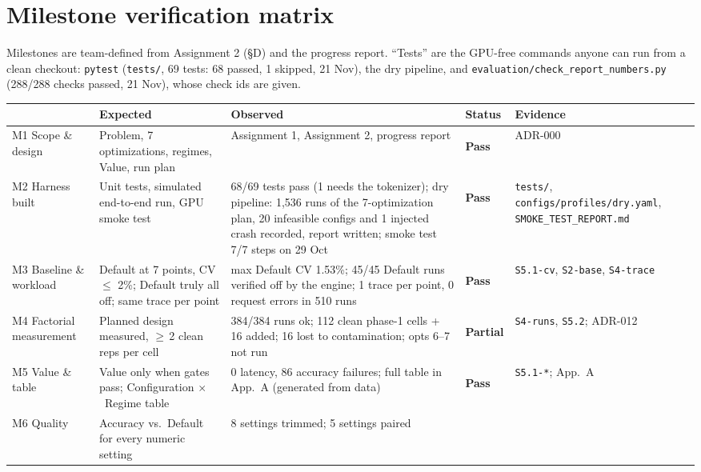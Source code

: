 \documentclass[10pt,a4paper]{article}
\newcommand{\hc}[1]{{\leavevmode\bfseries\color{ink}#1}}   %
\newcommand{\x}{\ensuremath{\times}}
\newcommand{\fp}[1]{{\leavevmode\urlstyle{tt}\color{codecol}\nolinkurl{#1}}}
\newcommand{\pill}[2]{\colorbox{#1}{\sffamily\footnotesize\strut #2}}
\newcommand{\pass}{\pill{passbg}{\textcolor{passgreen}{\textbf{Pass}}}}
\newcommand{\partl}{\pill{partbg}{\textbf{Partial}}}
\begin{document}
\section{Milestone verification matrix}\label{sec:milestones}
Milestones are team-defined from Assignment 2 (\S D) and the progress report. ``Tests'' are the GPU-free commands
anyone can run from a clean checkout: \texttt{pytest} (\fp{tests/}, 69 tests: 68 passed, 1 skipped, 21 Nov), the
dry pipeline, and \fp{evaluation/check_report_numbers.py} (288/288 checks passed, 21 Nov), whose check ids are given.

{\small
\setlength{\tabcolsep}{3.5pt}
\begin{longtable}{@{}P{2.4cm}P{4.3cm}P{5.1cm}P{1.3cm}P{2.4cm}@{}}
\toprule
\rowcolor{tblhead}\hc{Milestone} & \hc{Expected} & \hc{Observed} & \hc{Status} & \hc{Evidence} \\
\midrule\endhead
M1 Scope \& design & Problem, 7 optimizations, regimes, Value, run plan & Assignment 1, Assignment 2, progress report
& \pass & ADR-000 \\
 M2 Harness built & Unit tests, simulated end-to-end run, GPU smoke test & 68/69 tests pass (1 needs
the tokenizer); dry pipeline: 1,536 runs of the 7-optimization plan, 20 infeasible configs and 1 injected crash
recorded, report written; smoke test 7/7 steps on 29 Oct & \pass & \fp{tests/},
\fp{configs/profiles/dry.yaml}, \fp{SMOKE_TEST_REPORT.md} \\
M3 Baseline \& workload & Default at 7 points, CV $\le$ 2\%; Default truly all off; same trace per point & max
Default CV 1.53\%; 45/45 Default runs verified off by the engine; 1 trace per point, 0 request errors in 510 runs &
\pass & \texttt{S5.1-cv}, \texttt{S2-base}, \texttt{S4-trace} \\
 M4 Factorial measurement & Planned design measured, $\ge$\,2 clean reps per cell & 384/384 runs
ok; 112 clean phase-1 cells + 16 added; 16 lost to contamination; opts 6--7 not run & \partl & \texttt{S4-runs},
\texttt{S5.2}; ADR-012 \\
M5 Value \& table & Value only when gates pass; Configuration \x\ Regime table & 0 latency, 86 accuracy failures;
full table in App.\ A (generated from data) & \pass & \texttt{S5.1-*}; App.\ A \\
 M6 Quality & Accuracy vs.\ Default for every numeric setting & 8 settings trimmed; 5 settings paired

\end{longtable}}
\end{document}
